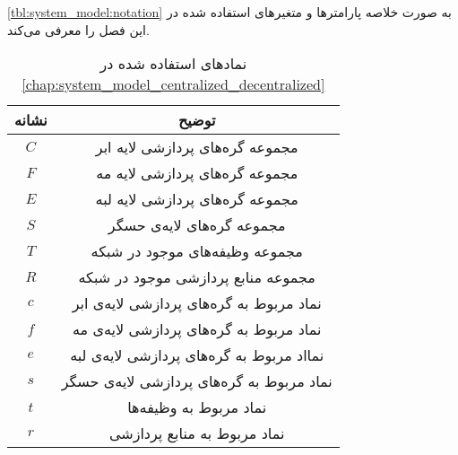 	    \cref{tbl:system_model:notation} به صورت خلاصه پارامتر‌ها و متغیر‌های استفاده شده در این فصل را معرفی می‌کند.
	\begin{table}[h]
		\caption{نماد‌های استفاده شده در \cref{chap:system_model_centralized_decentralized}}
		\begin{tabularx}{\textwidth}{|c|C|} \hline
			نشانه                & توضیح                                                                                     \\ \hline
			$C$                 & مجموعه‌ گره‌های پردازشی لایه ابر    \\ \hline                                                                   
			$F$                 & مجموعه‌ گره‌های پردازشی لایه مه     \\ \hline                                                                  
			$E$                 & مجموعه‌ گره‌های پردازشی لایه لبه    \\ \hline                                                                   
			$S$                 & مجموعه‌ گره‌های لایه‌ی حسگر            \\ \hline                                                                                
			$T$                 & مجموعه‌ وظیفه‌های موجود در شبکه      \\ \hline                                                            
			$R$                 & مجموعه‌ منابع پردازشی موجود در شبکه      \\ \hline                                                            
			$c$                 & نماد مربوط به گره‌های پردازشی لایه‌ی ابر   \\ \hline                                                                    
			$f$                 & نماد مربوط به گره‌های پردازشی لایه‌ی مه    \\ \hline                                                                   
			$e$                 & نمااد مربوط به گره‌های پردازشی لایه‌ی لبه   \\ \hline                                                                    
			$s$                 & نماد مربوط به گره‌های پردازشی لایه‌ی حسگر   \\ \hline                                                                                         
			$t$                 & نماد مربوط به وظیفه‌ها       \\ \hline                                                           
			$r$                 & نماد مربوط به منابع پردازشی   \\ \hline                                                                                         

\end{tabularx}
\end{table}
